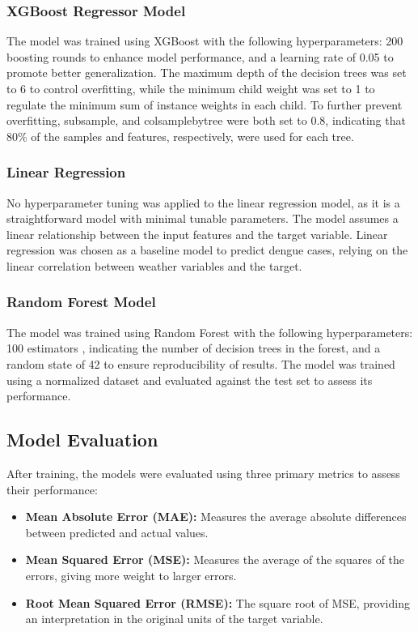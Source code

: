 \documentclass{article}
\begin{document}
\subsubsection{XGBoost Regressor Model}
The model was trained using XGBoost with the following hyperparameters: 200 boosting rounds to enhance model performance, and a learning rate of 0.05 to promote better generalization. The maximum depth of the decision trees was set to 6 to control overfitting, while the minimum child weight was set to 1 to regulate the minimum sum of instance weights in each child. To further prevent overfitting, subsample, and colsamplebytree were both set to 0.8, indicating that 80\% of the samples and features, respectively, were used for each tree. 

\subsubsection{Linear Regression}
No hyperparameter tuning was applied to the linear regression model, as it is a straightforward model with minimal tunable parameters. The model assumes a linear relationship between the input features and the target variable. Linear regression was chosen as a baseline model to predict dengue cases, relying on the linear correlation between weather variables and the target. 

\subsubsection{Random Forest Model}
The model was trained using Random Forest with the following hyperparameters: 100 estimators , indicating the number of decision trees in the forest, and a random state of 42 to ensure reproducibility of results. The model was trained using a normalized dataset and evaluated against the test set to assess its performance.

\subsection{Model Evaluation}
After training, the models were evaluated using three primary metrics to assess their performance:
\begin{itemize}
    \item \textbf{Mean Absolute Error (MAE):} Measures the average absolute differences between predicted and actual values.
    \item \textbf{Mean Squared Error (MSE):} Measures the average of the squares of the errors, giving more weight to larger errors.
    \item \textbf{Root Mean Squared Error (RMSE):} The square root of MSE, providing an interpretation in the original units of the target variable.
\end{itemize}
\end{document}
